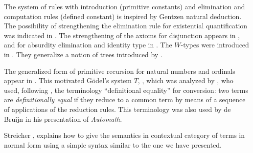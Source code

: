 \egroup

\sectionNotes\label{subsec:general-remarks}


The system of rules with introduction (primitive constants) and elimination
and computation rules (defined constant) is inspired by Gentzen natural
deduction. The possibility of strengthening the elimination rule for
existential quantification was indicated in \cite{howard:pat}. The
strengthening of the axioms for disjunction appears in \cite{Martin-Lof-1972},
and for absurdity elimination and identity type in \cite{Martin-Lof-1973}. The
$W$-types were introduced in \cite{Martin-Lof-1979}. They generalize a notion
of trees introduced by \cite{Tait-1968}.

The generalized form of primitive recursion for natural numbers and ordinals
appear in \cite{Hilbert-1925}.  This motivated G\"odel's system $T$,
\cite{Goedel-T-1958}, which was analyzed by \cite{Tait-1966}, who used,
following \cite{Goedel-1958}, the terminology ``definitional equality'' for
conversion: two terms are {\em definitionally equal} if they reduce to a
common term by means of a sequence of applications of the reduction
rules. This terminology was also used by de Bruijn \cite{deBruijn-1973} in his
presentation of {\em Automath}.

Streicher \cite[Theorem 4.13]{Streicher-1991}, explains how to give the
semantics in contextual category of terms in normal form using a simple syntax
similar to the one we have presented.


